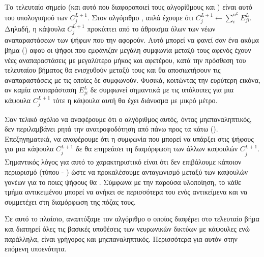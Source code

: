 Το τελευταίο σημείο (και αυτό που διαφοροποιεί τους αλγορίθμους  και ) είναι αυτό του υπολογισμού των $C_j^{L+1}$. Στον αλγόριθμο , απλά έχουμε ότι $C_j^{L+1} \gets \sum_i^{n^L} E^L_{ji}$. Δηλαδή, η κάψουλα $C_j^{L+1}$ προκύπτει από το άθροισμα όλων των νέων αναπαραστάσεων των ψήφων που την αφορούν. Αυτό μπορεί να φανεί σαν ένα ακόμα βήμα  () αφού οι ψήφοι που εμφάνιζαν μεγάλη συμφωνία μεταξύ τους αφενός έχουν νέες αναπαραστάσεις με μεγαλύτερο μήκος και αφετέρου, κατά την πρόσθεση του τελευταίου βήματος θα ενισχυθούν μεταξύ τους και θα αποσιωπήσουν τις αναπαραστάσεις με τις οποίες δε συμφωνούν. Φυσικά, κοιτώντας την ευρύτερη εικόνα, αν καμία αναπαράσταση $E^L_{ji}$ δε συμφωνεί σημαντικά με τις υπόλοιπες για μια κάψουλα $C_j^{L+1}$ τότε η κάψουλα αυτή θα έχει διάνυσμα με μικρό μέτρο.\par

Σαν τελικό σχόλιο να αναφέρουμε ότι ο αλγόριθμος αυτός, όντας μη\textendash επαναληπτικός, δεν περιλαμβάνει ρητά την ανατροφοδότηση από πάνω προς τα κάτω (). Επεξηγηματικά, να αναφέρουμε ότι η συμφωνία που μπορεί να υπάρξει στις ψήφους για μια κάψουλα $C_j^{L+1}$ δε θα επηρεάσει τη διαμόρφωση των άλλων καψουλών $C_{\grave{j}}^{L+1}$. Σημαντικός λόγος για αυτό το χαρακτηριστικό είναι ότι δεν επιβάλουμε κάποιον περιορισμό (τύπου  - ) ώστε να προκαλέσουμε ανταγωνισμό μεταξύ των καψουλών γονέων για το ποιες ψήφους θα . Σύμφωνα με την παρούσα υλοποίηση, το κάθε τμήμα αντικειμένου μπορεί να ανήκει σε περισσότερα του ενός αντικείμενα και να συμμετέχει στη διαμόρφωση της πόζας τους.\par

Σε αυτό το πλαίσιο, αναπτύξαμε τον αλγόριθμο  ο οποίος διαφέρει στο τελευταίο βήμα και διατηρεί όλες τις βασικές υποθέσεις των νευρωνικών δικτύων με κάψουλες ενώ παράλληλα, είναι γρήγορος και μη\textendash επαναληπτικός. Περισσότερα για αυτόν στην επόμενη υπο\textendash ενότητα.


